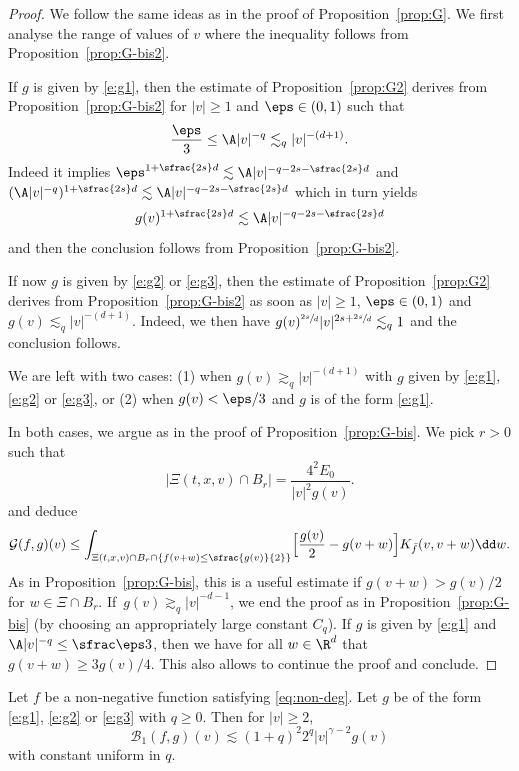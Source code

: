 \begin{proof}
We follow the same ideas as in the proof of
Proposition~\ref{prop:G}. We first analyse the range of values of
$v$ where the inequality follows from Proposition~\ref{prop:G-bis2}.

If $g$ is given by \eqref{e:g1}, then the estimate of
Proposition~\ref{prop:G2} derives from Proposition~\ref{prop:G-bis2}
for $|v| \ge 1$ and $\eps \in (0,1)$ such that
\[ \frac{\eps}3 \le \A |v|^{-q} \lesssim_q |v|^{-(d+1)}. \] Indeed
it implies
$\eps^{1+\sfrac{2s}d} \lesssim \A |v|^{-q - 2s - \sfrac{2s}d}$ and
$(\A |v|^{-q})^{1+\sfrac{2s}d} \lesssim \A |v|^{-q - 2s -
\sfrac{2s}d}$ which in turn yields
\[ g(v)^{1+\sfrac{2s}d} \lesssim \A |v|^{-q-2s - \sfrac{2s}d}\] and
then the conclusion follows from Proposition~\ref{prop:G-bis2}.

If now $g$ is given by \eqref{e:g2} or \eqref{e:g3}, then the
estimate of Proposition~\ref{prop:G2} derives from
Proposition~\ref{prop:G-bis2} as soon as $|v| \ge 1$,
$\eps \in (0,1)$ and $g(v) \lesssim_q |v|^{-(d+1)}$. Indeed, we then
have $g(v)^{\sfrac{2s}d} |v|^{2s + \sfrac{2s}d} \lesssim_q 1$ and the
conclusion follows.

We are left with two cases: (1) when $g(v) \gtrsim_q |v|^{-(d+1)}$ with
$g$ given by \eqref{e:g1}, \eqref{e:g2} or \eqref{e:g3}, or
(2) when $g(v) < \eps/3$ and $g$ is of the form \eqref{e:g1}.

In both cases, we argue as in the proof of
Proposition~\ref{prop:G-bis}. We pick $r>0$ such that
\[ \left|\Xi(t,x,v) \cap B_r\right| = \frac{4^2E_0}{|v|^2 g(v)}.\]
and deduce
\[
\mathcal G(f,g)(v) \leq \int_{\Xi(t,x,v) \cap B_r \cap \left\{f(v+w)
\le \sfrac{g(v)}{2}\right\}} \Bigl[ \frac{g(v)}{2} - g(v+w)\Bigr]
K_{\bar f}(v,v+w) \dd w.
\]
As in Proposition~\ref{prop:G-bis}, this is a useful estimate if
$g(v+w) > g(v)/2$ for $w \in \Xi \cap B_r$. If~$g(v) \gtrsim_q |v|^{-d-1}$, we end the proof as in
Proposition~\ref{prop:G-bis} (by choosing an appropriately large
constant $C_q$). If $g$ is given by \eqref{e:g1} and
$\A |v|^{-q} \le \sfrac\eps3$, then we have for all $w \in \R^d$ that
$g(v+w) \ge 3g(v)/4$. This also allows to continue the proof and
conclude.
\end{proof}

\begin{prop} \label{prop:B1-2} Let $f$ be a non-negative function satisfying \eqref{eq:non-deg}. Let $g$ be of
the form \eqref{e:g1}, \eqref{e:g2} or \eqref{e:g3} with $q \ge
0$. Then for $|v| \ge 2$,
\[ \mathcal{B}_1 (f,g)(v) \lesssim (1+q)^2 2^q |v|^{\gamma -2} g(v)\]
with constant uniform in $q$.
\end{prop}

